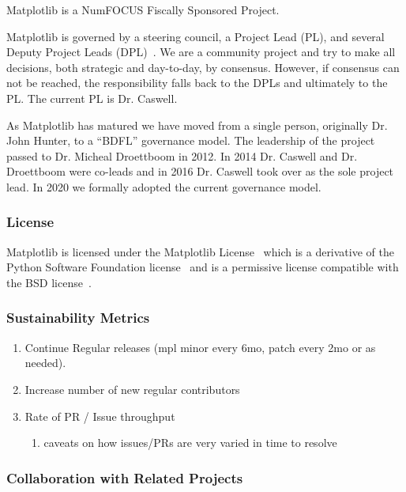 \documentclass[12pt]{article}
\numberwithin{page}{section}
\begin{document}
Matplotlib is a NumFOCUS Fiscally Sponsored Project.


Matplotlib is governed by a steering council, a Project Lead (PL), and
several Deputy Project Leads (DPL)~\cite{gov}.  We are a community
project and try to make all decisions, both strategic and day-to-day,
by consensus.  However, if consensus can not be reached, the
responsibility falls back to the DPLs and ultimately to the PL.  The
current PL is Dr. Caswell.

As Matplotlib has matured we have moved from a single person,
originally Dr. John Hunter, to a ``BDFL'' governance model.  The
leadership of the project passed to Dr. Micheal Droettboom in 2012.
In 2014 Dr. Caswell and Dr. Droettboom were co-leads and in 2016
Dr. Caswell took over as the sole project lead.  In 2020 we formally
adopted the current governance model.

\subsubsection{License}

Matplotlib is licensed under the Matplotlib License~\cite{mpl_lic}
which is a derivative of the Python Software Foundation
license~\cite{psf_lic} and is a permissive license compatible with the
BSD license~\cite{jdh_bsd_opinions}.


\subsubsection{Sustainability Metrics}
\begin{enumerate}
\item Continue Regular releases (mpl minor every 6mo, patch every 2mo
  or as needed).
\item Increase number of new regular contributors
\item Rate of PR / Issue throughput
  \begin{enumerate}
  \item caveats on how issues/PRs are very varied in time to resolve
  \end{enumerate}
\end{enumerate}

\subsubsection{Collaboration with Related Projects}
\end{document}
